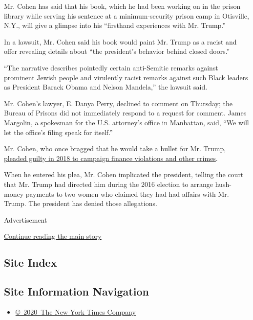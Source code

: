 Mr. Cohen has said that his book, which he had been working on in the
prison library while serving his sentence at a minimum-security prison
camp in Otisville, N.Y., will give a glimpse into his ``firsthand
experiences with Mr. Trump.''

In a lawsuit, Mr. Cohen said his book would paint Mr. Trump as a racist
and offer revealing details about ``the president's behavior behind
closed doors.''

``The narrative describes pointedly certain anti-Semitic remarks against
prominent Jewish people and virulently racist remarks against such Black
leaders as President Barack Obama and Nelson Mandela,'' the lawsuit
said.

Mr. Cohen's lawyer, E. Danya Perry, declined to comment on Thursday; the
Bureau of Prisons did not immediately respond to a request for comment.
James Margolin, a spokesman for the U.S. attorney's office in Manhattan,
said, ``We will let the office's filing speak for itself.''

Mr. Cohen, who once bragged that he would take a bullet for Mr. Trump,
\href{https://slack-redir.net/link?url=https\%3A\%2F\%2Fwww.nytimes.com\%2F2018\%2F08\%2F21\%2Fnyregion\%2Fmichael-cohen-guilty-plea-trump-takeaways.html}{pleaded
guilty in 2018 to campaign finance violations and other crimes}.

When he entered his plea, Mr. Cohen implicated the president, telling
the court that Mr. Trump had directed him during the 2016 election to
arrange hush-money payments to two women who claimed they had had
affairs with Mr. Trump. The president has denied those allegations.

Advertisement

\protect\hyperlink{after-bottom}{Continue reading the main story}

\hypertarget{site-index}{%
\subsection{Site Index}\label{site-index}}

\hypertarget{site-information-navigation}{%
\subsection{Site Information
Navigation}\label{site-information-navigation}}

\begin{itemize}
\tightlist
\item
  \href{https://help.nytimes.com/hc/en-us/articles/115014792127-Copyright-notice}{©~2020~The
  New York Times Company}
\end{itemize}

